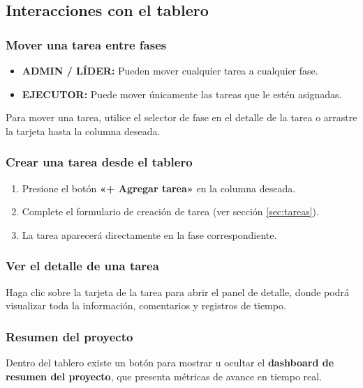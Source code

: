 \documentclass[12pt, a4paper]{article}
\begin{document}
\subsection{Interacciones con el tablero}

\subsubsection{Mover una tarea entre fases}

\begin{itemize}
  \item \textbf{ADMIN / LÍDER:} Pueden mover cualquier tarea a cualquier fase.
  \item \textbf{EJECUTOR:} Puede mover únicamente las tareas que le estén asignadas.
\end{itemize}

Para mover una tarea, utilice el selector de fase en el detalle de la tarea o arrastre la tarjeta hasta la columna deseada.

\subsubsection{Crear una tarea desde el tablero}

\begin{enumerate}
  \item Presione el botón \textbf{«+ Agregar tarea»} en la columna deseada.
  \item Complete el formulario de creación de tarea (ver sección \ref{sec:tareas}).
  \item La tarea aparecerá directamente en la fase correspondiente.
\end{enumerate}

\subsubsection{Ver el detalle de una tarea}

Haga clic sobre la tarjeta de la tarea para abrir el panel de detalle, donde podrá visualizar toda la información, comentarios y registros de tiempo.

\subsubsection{Resumen del proyecto}

Dentro del tablero existe un botón para mostrar u ocultar el \textbf{dashboard de resumen del proyecto}, que presenta métricas de avance en tiempo real.
\end{document}
